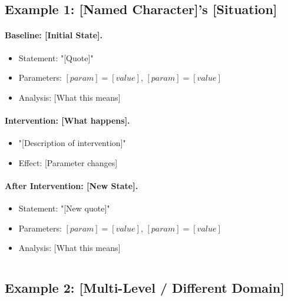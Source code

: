 

\subsection{Example 1: [Named Character]'s [Situation]}

\paragraph{Baseline: [Initial State].}
\begin{itemize}
    \item Statement: "[Quote]"
    \item Parameters: $[param] = [value]$, $[param] = [value]$
    \item Analysis: [What this means]
\end{itemize}

\paragraph{Intervention: [What happens].}
\begin{itemize}
    \item "[Description of intervention]"
    \item Effect: [Parameter changes]
\end{itemize}

\paragraph{After Intervention: [New State].}
\begin{itemize}
    \item Statement: "[New quote]"
    \item Parameters: $[param] = [value]$, $[param] = [value]$
    \item Analysis: [What this means]
\end{itemize}

\begin{equation}
[Summary equation showing change]
\label{eq:[example-name]}
\end{equation}


\subsection{Example 2: [Multi-Level / Different Domain]}

